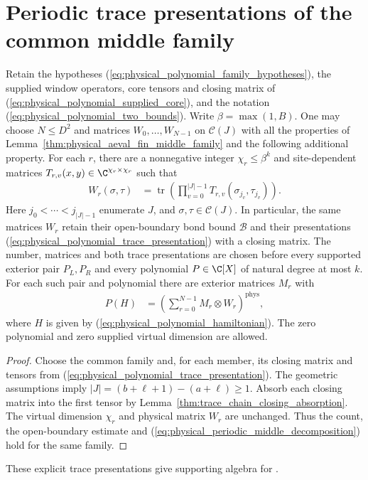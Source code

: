 \section{Periodic trace presentations of the common middle family}

\begin{lemma}
    \label{thm:physical_aeval_periodic_middle_family}
    \leanok
    Retain the hypotheses (\ref{eq:physical_polynomial_family_hypotheses}),
    the supplied window operators, core tensors and closing matrix of
    (\ref{eq:physical_polynomial_supplied_core}), and the notation
    (\ref{eq:physical_polynomial_two_bounds}). Write $\beta=\max(1,B)$.
    One may choose $N\le D^2$ and matrices $W_0,\ldots,W_{N-1}$ on
    $\mathcal C(J)$ with all the properties of
    Lemma~\ref{thm:physical_aeval_fin_middle_family} and the following
    additional property. For each $r$, there are a nonnegative integer
    $\chi_r\le\beta^k$ and site-dependent matrices
    $T_{r,v}(x,y)\in\C^{\chi_r\times\chi_r}$ such that
    \begin{align}
        W_r(\sigma,\tau)
         & =\operatorname{tr}\left(
        \prod_{v=0}^{|J|-1}T_{r,v}(\sigma_{j_v},\tau_{j_v})\right).
        \label{eq:physical_periodic_middle_trace}
    \end{align}
    Here $j_0<\cdots<j_{|J|-1}$ enumerate $J$, and
    $\sigma,\tau\in\mathcal C(J)$.
    In particular, the same matrices $W_r$ retain their open-boundary bond
    bound $\mathcal B$ and their presentations
    (\ref{eq:physical_polynomial_trace_presentation}) with a closing matrix.
    The number, matrices and both trace presentations are chosen before
    every supported exterior pair $P_L,P_R$ and every polynomial
    $P\in\C[X]$ of natural degree at most $k$.
    For each such pair and polynomial there are exterior matrices $M_r$ with
    \begin{align}
        P(H) & =\left(\sum_{r=0}^{N-1}M_r\otimes W_r\right)^{\mathrm{phys}},
        \label{eq:physical_periodic_middle_decomposition}
    \end{align}
    where $H$ is given by (\ref{eq:physical_polynomial_hamiltonian}).
    The zero polynomial and zero supplied virtual dimension are allowed.
\end{lemma}
\begin{proof}\leanok
    Choose the common family and, for each member, its closing matrix and
    tensors from (\ref{eq:physical_polynomial_trace_presentation}).
    The geometric assumptions imply $|J|=(b+\ell+1)-(a+\ell)\ge1$.
    Absorb each closing matrix into the first tensor by
    Lemma~\ref{thm:trace_chain_closing_absorption}. The virtual dimension
    $\chi_r$ and physical matrix $W_r$ are unchanged. Thus the count, the
    open-boundary estimate and (\ref{eq:physical_periodic_middle_decomposition})
    hold for the same family.
\end{proof}

These explicit trace presentations give supporting algebra for
\cite[Proposition~5.7]{Arad2016RigorousRG}.
